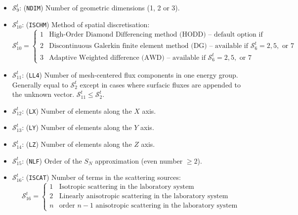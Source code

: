 \begin{itemize}
\item $\mathcal{S}^{t}_{9}$: ({\tt NDIM}) Number of geometric dimensions (1, 2 or 3).

\item $\mathcal{S}^{t}_{10}$: ({\tt ISCHM}) Method of spatial discretisation:
\begin{displaymath}
\mathcal{S}^{t}_{10} = \left\{
\begin{array}{rl}
 1 & \textrm{High-Order Diamond Differencing method (HODD) -- default option if unspecified} \\
 2 & \textrm{Discontinuous Galerkin finite element method (DG) -- available if $\mathcal{S}^{t}_{6} = 2, 5,$ or $7$}\\
 3 & \textrm{Adaptive Weighted difference (AWD) -- available if $\mathcal{S}^{t}_{6} = 2, 5,$ or $7$}
\end{array} \right.
\end{displaymath}

\item $\mathcal{S}^{t}_{11}$: ({\tt LL4}) Number of mesh-centered flux components in one energy group.
Generally equal to
$\mathcal{S}^{t}_{2}$ except in cases where surfacic fluxes are appended to the
unknown vector. $\mathcal{S}^{t}_{11}\le\mathcal{S}^{t}_{2}$.

\item $\mathcal{S}^{t}_{12}$: ({\tt LX}) Number of elements along the $X$ axis.

\item $\mathcal{S}^{t}_{13}$: ({\tt LY}) Number of elements along the $Y$ axis.

\item $\mathcal{S}^{t}_{14}$: ({\tt LZ}) Number of elements along the $Z$ axis.

\item $\mathcal{S}^{t}_{15}$: ({\tt NLF}) Order of the $S_N$ approximation (even number $\ge 2$).

\item $\mathcal{S}^{t}_{16}$: ({\tt ISCAT}) Number of terms in the scattering sources:
\begin{displaymath}
\mathcal{S}^{t}_{16} = \left\{
\begin{array}{rl}
 1 & \textrm{Isotropic scattering in the laboratory system} \\
 2 & \textrm{Linearly anisotropic scattering in the laboratory system} \\
 n & \textrm{order $n-1$ anisotropic scattering in the laboratory system}
\end{array} \right.
\end{displaymath}


\end{itemize}
